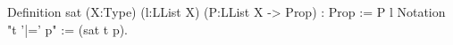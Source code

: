 Definition sat (X:Type) (l:LList X) (P:LList X -> Prop) : Prop := P l
Notation "t '|=' p" := (sat t p).